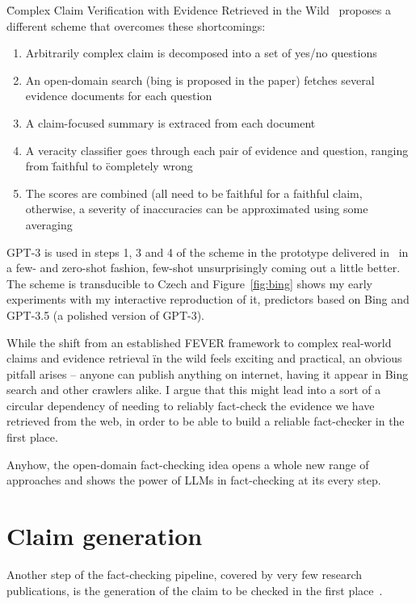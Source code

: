 \"{Complex Claim Verification with Evidence Retrieved in the Wild}~\cite{bing} proposes a different scheme that overcomes these shortcomings:

\begin{enumerate}
    \item Arbitrarily complex claim is decomposed into a set of yes/no questions
    \item An open-domain search (bing is proposed in the paper) fetches several evidence documents for each question
    \item A claim-focused summary is extraced from each document
    \item A veracity classifier goes through each pair of evidence and question, ranging from \"{faithful} to \"{completely wrong}
    \item The scores are combined (all need to be \"{faithful} for a faithful claim, otherwise, a severity of inaccuracies can be approximated using some averaging 
\end{enumerate}

GPT-3 is used in steps 1, 3 and 4 of the scheme in the prototype delivered in~\cite{bing} in a few- and zero-shot fashion, few-shot unsurprisingly coming out a little better. The scheme is transducible to Czech and Figure~\ref{fig:bing} shows my early experiments with my interactive reproduction of it, predictors based on Bing and GPT-3.5 (a polished version of GPT-3).

While the shift from an established FEVER framework to complex real-world claims and evidence retrieval \"{in the wild} feels exciting and practical, an obvious pitfall arises -- anyone can publish anything on internet, having it appear in Bing search and other crawlers alike. I argue that this might lead into a sort of a circular dependency of needing to reliably fact-check the evidence we have retrieved from the web, in order to be able to build a reliable fact-checker in the first place.

Anyhow, the open-domain fact-checking idea opens a whole new range of approaches and shows the power of LLMs in fact-checking at its every step.

\section{Claim generation}
Another step of the fact-checking pipeline, covered by very few research publications, is the generation of the claim to be checked in the first place~\cite{guo-etal-2022-survey}.

